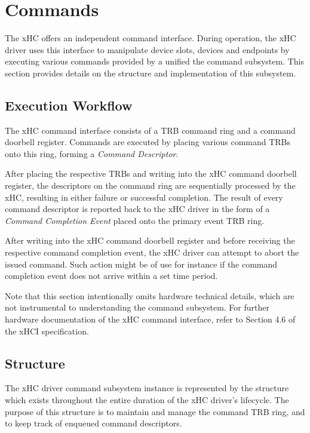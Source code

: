 \section{Commands}

The xHC offers an independent command interface. During operation, the xHC
driver uses this interface to manipulate device slots, devices and endpoints by
executing various commands provided by a unified the command subsystem. This
section provides details on the structure and implementation of this subsystem.


\subsection{Execution Workflow}

The xHC command interface consists of a TRB command ring and a command doorbell
register. Commands are executed by placing various command TRBs onto this ring,
forming a \textit{Command Descriptor}.

After placing the respective TRBs and writing into the xHC command doorbell
register, the descriptors on the command ring are sequentially processed by the
xHC, resulting in either failure or successful completion. The result of every
command descriptor is reported back to the xHC driver in the form of a
\textit{Command Completion Event} placed onto the primary event TRB ring.

After writing into the xHC command doorbell register and before receiving the
respective command completion event, the xHC driver can attempt to abort the
issued command. Such action might be of use for instance if the command
completion event does not arrive within a set time period.

Note that this section intentionally omits hardware technical details, which are
not instrumental to understanding the command subsystem. For further hardware
documentation of the xHC command interface, refer to Section 4.6 of the xHCI
specification.


\subsection{Structure}

The xHC driver command subsystem instance is represented by the
 structure which exists throughout the entire duration
of the xHC driver's lifecycle. The purpose of this structure is to maintain and
manage the command TRB ring, and to keep track of enqueued command descriptors.


